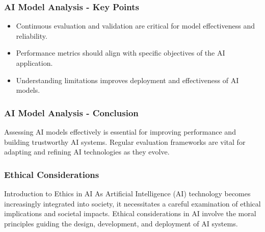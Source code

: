 \documentclass[aspectratio=169]{beamer}
\begin{document}
\begin{frame}[fragile]
    \frametitle{AI Model Analysis - Key Points}
    \begin{itemize}
        \item Continuous evaluation and validation are critical for model effectiveness and reliability.
        \item Performance metrics should align with specific objectives of the AI application.
        \item Understanding limitations improves deployment and effectiveness of AI models.
    \end{itemize}
\end{frame}

\begin{frame}[fragile]
    \frametitle{AI Model Analysis - Conclusion}
    Assessing AI models effectively is essential for improving performance and building trustworthy AI systems. 
    Regular evaluation frameworks are vital for adapting and refining AI technologies as they evolve.
\end{frame}

\begin{frame}[fragile]
    \frametitle{Ethical Considerations}
    \begin{block}{Introduction to Ethics in AI}
        As Artificial Intelligence (AI) technology becomes increasingly integrated into society, it necessitates a careful examination of ethical implications and societal impacts. 
        Ethical considerations in AI involve the moral principles guiding the design, development, and deployment of AI systems.
    \end{block}
\end{frame}
\end{document}
